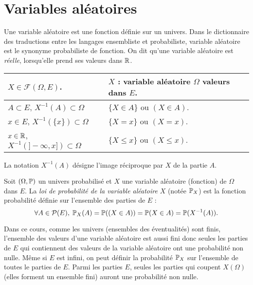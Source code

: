 

\section{Variables aléatoires}
Une variable aléatoire est une fonction définie sur un univers. Dans le dictionnaire des traductions entre les langages ensembliste et probabiliste, \og variable aléatoire\fg ~ est le synonyme probabiliste de \og fonction\fg.\newline 
On dit qu'une variable aléatoire est \emph{réelle}, lorsqu'elle prend ses valeurs dans $\mathbb{R}$.
\begin{center}
\renewcommand{\arraystretch}{1.5}
\begin{tabular}{|l|l|} \hline
$X \in \mathcal{F}(\Omega,E)$.                    & $X$ : variable aléatoire $\Omega$ valeurs dans $E$.\\ \hline
$A\subset E$, $X^{-1}(A) \subset \Omega$          & $\{X \in A\}$ ou $(X\in A)$. \\ \hline
$x\in E$, $X^{-1}(\{x\}) \subset\Omega$           & $\{X =x\}$ ou $(X=x)$. \\ \hline
$x\in \mathbb{R}$, $X^{-1}(]-\infty,x]) \subset \Omega$   & $\{X \leq x\}$ ou $(X \leq x)$. \\ \hline
\end{tabular} 
\end{center}

La notation $X^{-1}(A)$ désigne l'image réciproque par $X$ de la partie $A$.
\begin{defi}
  Soit $(\Omega, \mathbb{P})$ un univers probabilisé et $X$ une variable aléatoire (fonction) de $\Omega$ dans $E$.\newline
  La \emph{loi de probabilité de la variable aléatoire} $X$ (notée $\mathbb{P}_X$) est la fonction probabilité définie sur l'ensemble des parties de $E$ :
\begin{displaymath}
\forall A \in \mathcal{P}(E), \; \mathbb{P}_X(A) = \mathbb{P}((X\in A)) = \mathbb{P}(X\in A) = \mathbb{P}(X^{-1}(A)).
\end{displaymath}
\end{defi}
\begin{rem}
Dans ce cours, comme les univers (ensembles des éventualités) sont finis, l'ensemble des valeurs d'une variable aléatoire est aussi fini donc seules les parties de $E$ qui contiennent des valeurs de la variable aléatoire ont une probabilité non nulle. Même si $E$ est infini, on peut définir la probabilité $\mathbb{P}_X$ sur l'ensemble de toutes le parties de $E$. Parmi les parties $E$, seules les parties qui coupent $X(\Omega)$ (elles forment un ensemble fini) auront une probabilité non nulle.   
\end{rem}

